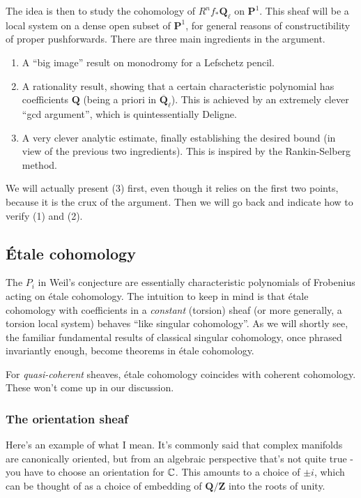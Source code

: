 \documentclass[letterpaper,11pt]{article}
\newcommand{\Q}{\mathbf{Q}}
\newcommand{\Z}{\mathbf{Z}}
\newcommand{\ol}[1]{\overline{#1}}
\newcommand{\PS}{\mathbf{P}}
\begin{document}
The idea is then to study the cohomology of $R^n f_* \Q_{\ell}$ on $\PS^1$. This sheaf will be a local system on a dense open subset of $\PS^1$, for general reasons of constructibility of proper pushforwards. There are three main ingredients in the argument. 
\begin{enumerate}
\item A ``big image'' result on monodromy for a Lefschetz pencil. 
\item A rationality result, showing that a certain characteristic polynomial has coefficients $\Q$ (being a priori in $\ol{\Q}_{\ell}$). This is achieved by an extremely clever ``gcd argument'', which is quintessentially Deligne. 
\item A very clever analytic estimate, finally establishing the desired bound (in view of the previous two ingredients). This is inspired by the Rankin-Selberg method. 
\end{enumerate}
We will actually present (3) first, even though it relies on the first two points, because it is the crux of the argument. Then we will go back and indicate how to verify (1) and (2). 


\subsection{\'{E}tale cohomology}

The $P_i$ in Weil's conjecture are essentially characteristic polynomials of Frobenius acting on \'{e}tale cohomology. The intuition to keep in mind is that \'{e}tale cohomology with coefficients in a \emph{constant} (torsion) sheaf (or more generally, a torsion local system) behaves ``like singular cohomology''. As we will shortly see, the familiar fundamental results of classical singular cohomology, once phrased invariantly enough, become theorems in \'{e}tale cohomology. 

\begin{remark}
For \emph{quasi-coherent} sheaves, \'{e}tale cohomology coincides with coherent cohomology. These won't come up in our discussion. 
\end{remark}

\subsubsection{The orientation sheaf}
Here's an example of what I mean. It's commonly said that complex manifolds are canonically oriented, but from an algebraic perspective that's not quite true - you have to choose an orientation for $\mathbb{C}$. This amounts to a choice of $\pm i$, which can be thought of as a choice of embedding of $\Q/\Z$ into the roots of unity. 
\end{document}
